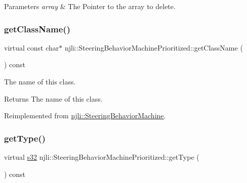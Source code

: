 \begin{DoxyParams}{Parameters}
{\em array} & The Pointer to the array to delete. \\
\hline
\end{DoxyParams}
\mbox{\label{classnjli_1_1_steering_behavior_machine_prioritized_a0688707312da3b16368bbe4a8ed28462}} 
\subsubsection{\texorpdfstring{get\+Class\+Name()}{getClassName()}}
{\footnotesize\ttfamily virtual const char$\ast$ njli\+::\+Steering\+Behavior\+Machine\+Prioritized\+::get\+Class\+Name (\begin{DoxyParamCaption}{ }\end{DoxyParamCaption}) const\hspace{0.3cm}{\ttfamily [virtual]}}

The name of this class.

\begin{DoxyReturn}{Returns}
The name of this class. 
\end{DoxyReturn}


Reimplemented from \mbox{\hyperlink{classnjli_1_1_steering_behavior_machine_a62b8ba5c3e2b9f63eb146721c03d37a1}{njli\+::\+Steering\+Behavior\+Machine}}.

\mbox{\label{classnjli_1_1_steering_behavior_machine_prioritized_adbf4f6b3ea233a5ae575d366b977d630}} 
\subsubsection{\texorpdfstring{get\+Type()}{getType()}}
{\footnotesize\ttfamily virtual \mbox{\hyperlink{_util_8h_aa62c75d314a0d1f37f79c4b73b2292e2}{s32}} njli\+::\+Steering\+Behavior\+Machine\+Prioritized\+::get\+Type (\begin{DoxyParamCaption}{ }\end{DoxyParamCaption}) const\hspace{0.3cm}{\ttfamily [virtual]}}

